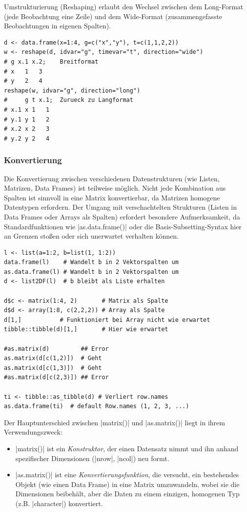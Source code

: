 \documentclass[10pt,twocolumn]{scrartcl}
\renewcommand{\lstinline}{\mycoloredinline}
\begin{document}
Umstrukturierung (Reshaping) erlaubt den Wechsel zwischen dem Long-Format (jede Beobachtung eine Zeile) und dem Wide-Format (zusammengefasste Beobachtungen in eigenen Spalten).

\begin{lstlisting}
d <- data.frame(x=1:4, g=c("x","y"), t=c(1,1,2,2))
w <- reshape(d, idvar="g", timevar="t", direction="wide")
# g x.1 x.2;    Breitformat
# x   1   3
# y   2   4
reshape(w, idvar="g", direction="long")
#     g t x.1;  Zurueck zu Langformat
# x.1 x 1   1
# y.1 y 1   2
# x.2 x 2   3
# y.2 y 2   4
\end{lstlisting}


\subsubsection{Konvertierung}

Die Konvertierung zwischen verschiedenen Datenstrukturen (wie Listen, Matrizen, Data Frames) ist teilweise möglich. Nicht jede Kombination aus Spalten ist sinnvoll in eine Matrix konvertierbar, da Matrizen homogene Datentypen erfordern. Der Umgang mit verschachtelten Strukturen (Listen in Data Frames oder Arrays als Spalten) erfordert besondere Aufmerksamkeit, da Standardfunktionen wie \lstinline|as.data.frame()| oder die Basis-Subsetting-Syntax hier an Grenzen stoßen oder sich unerwartet verhalten können.

\begin{lstlisting}
l <- list(a=1:2, b=list(1, 1:2))
data.frame(l)    # Wandelt b in 2 Vektorspalten um
as.data.frame(l) # Wandelt b in 2 Vektorspalten um
d <- list2DF(l)  # b bleibt als Liste erhalten

d$c <- matrix(1:4, 2)       # Matrix als Spalte
d$d <- array(1:8, c(2,2,2)) # Array als Spalte
d[1,]           # Funktioniert bei Array nicht wie erwartet
tibble::tibble(d)[1,]       # Hier wie erwartet

#as.matrix(d)         ## Error
as.matrix(d[c(1,2)])  # Geht
as.matrix(d[c(1,3)])  # Geht
#as.matrix(d[c(2,3)]) ## Error

ti <- tibble::as_tibble(d) # Verliert row.names
as.data.frame(ti)  # default Row.names (1, 2, 3, ...)
\end{lstlisting}

Der Hauptunterschied zwischen \lstinline|matrix()| und \lstinline|as.matrix()| liegt in ihrem Verwendungszweck:
\begin{itemize}
\item \lstinline|matrix()| ist ein \emph{Konstruktor}, der einen Datensatz nimmt und ihn anhand spezifischer Dimensionen (\lstinline|nrow|, \lstinline|ncol|) neu formt.
\item \lstinline|as.matrix()| ist eine \emph{Konvertierungsfunktion}, die versucht, ein bestehendes Objekt (wie einen Data Frame) in eine Matrix umzuwandeln, wobei sie die Dimensionen beibehält, aber die Daten zu einem einzigen, homogenen Typ (z.B. \lstinline|character|) konvertiert.
\end{itemize}
\end{document}
